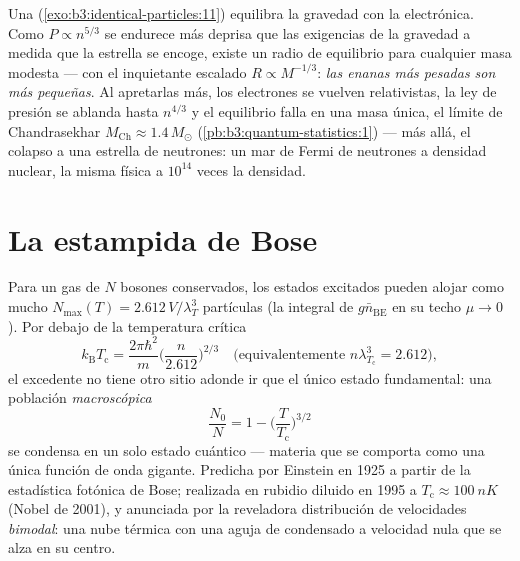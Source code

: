 \begin{example}\label{ex:b3:quantum-statistics:dwarf}
Una  (\cref{exo:b3:identical-particles:11}) equilibra la
gravedad con la  electrónica. Como $P \propto
n^{5/3}$ se endurece más deprisa que las exigencias de la gravedad a medida
que la estrella se encoge, existe un radio de equilibrio para cualquier masa
modesta --- con el inquietante escalado $R \propto M^{-1/3}$: \emph{las
enanas más pesadas son más pequeñas}. Al apretarlas más, los electrones se
vuelven relativistas, la ley de presión se ablanda hasta $n^{4/3}$ y el
equilibrio falla en una masa única, el límite de Chandrasekhar $M_{\text{Ch}} \approx
1.4\,M_\odot$ (\cref{pb:b3:quantum-statistics:1}) ---
más allá, el colapso a una estrella de neutrones: un mar de Fermi de
neutrones a densidad nuclear, la misma física a $10^{14}$ veces la densidad.
\end{example}

\section{La estampida de Bose}

\begin{theorem}\label{thm:b3:quantum-statistics:bec}
Para un gas de $N$ bosones conservados, los estados excitados pueden alojar
como mucho $N_{\max}(T) = 2.612\,V/\lambda_T^3$ partículas (la integral
de $g\bar n_{\text{BE}}$ en su techo $\mu \to 0$). Por debajo de la
temperatura crítica
\[
k_{\text{B}}T_{\text{c}} = \frac{2\pi\hbar^2}{m}
\Big(\frac{n}{2.612}\Big)^{2/3}
\quad\text{(equivalentemente } n\lambda_{T_{\text{c}}}^3 = 2.612
\text{)} ,
\]
el excedente no tiene otro sitio adonde ir que el único estado fundamental:
una población \emph{macroscópica}
\[
\frac{N_0}{N} = 1 - \Big(\frac{T}{T_{\text{c}}}\Big)^{3/2}
\]
se condensa en un solo estado cuántico --- materia que se comporta como una
única función de onda gigante. Predicha por Einstein en 1925 a partir de la
estadística fotónica de Bose; realizada en rubidio diluido en 1995 a
$T_{\text{c}} \approx \qty{100}{nK}$ (Nobel de 2001), y anunciada por
la reveladora distribución de velocidades \emph{bimodal}: una nube térmica
con una aguja de condensado a velocidad nula que se alza en su centro.
\end{theorem}
\admitted

